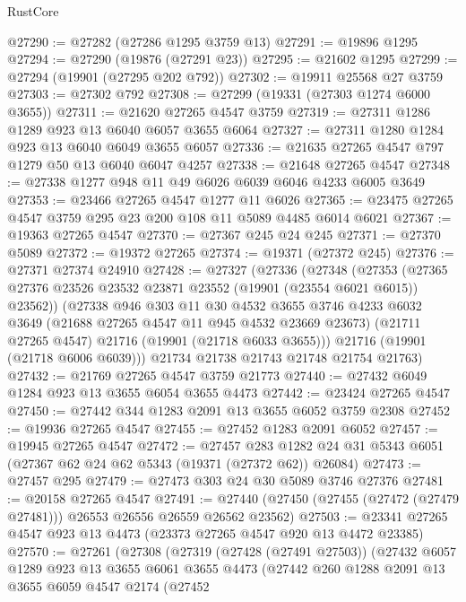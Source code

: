 \begin{lexlean}{RustCore}
\begin{coremodule}
@27290 := @27282 (@27286 @1295 @3759 @13)
@27291 := @19896 @1295
@27294 := @27290 (@19876 (@27291 @23))
@27295 := @21602 @1295
@27299 := @27294 (@19901 (@27295 @202 @792))
@27302 := @19911 @25568 @27 @3759
@27303 := @27302 @792
@27308 := @27299 (@19331 (@27303 @1274 @6000 @3655))
@27311 := @21620 @27265 @4547 @3759
@27319 := @27311 @1286 @1289 @923 @13 @6040 @6057 @3655 @6064
@27327 := @27311 @1280 @1284 @923 @13 @6040 @6049 @3655 @6057
@27336 := @21635 @27265 @4547 @797 @1279 @50 @13 @6040 @6047 @4257
@27338 := @21648 @27265 @4547
@27348 := @27338 @1277 @948 @11 @49 @6026 @6039 @6046 @4233 @6005 @3649
@27353 := @23466 @27265 @4547 @1277 @11 @6026
@27365 := @23475 @27265 @4547 @3759 @295 @23 @200 @108 @11 @5089 @4485 @6014 @6021
@27367 := @19363 @27265 @4547
@27370 := @27367 @245 @24 @245
@27371 := @27370 @5089
@27372 := @19372 @27265
@27374 := @19371 (@27372 @245)
@27376 := @27371 @27374 @24910
@27428 := @27327
    (@27336
      (@27348
        (@27353 (@27365 @27376 @23526 @23532 @23871 @23552 (@19901 (@23554 @6021 @6015)) @23562))
        (@27338
          @946
          @303
          @11
          @30
          @4532
          @3655
          @3746
          @4233
          @6032
          @3649
          (@21688 @27265 @4547 @11 @945 @4532 @23669 @23673)
          (@21711 @27265 @4547)
          @21716
          (@19901 (@21718 @6033 @3655)))
        @21716
        (@19901 (@21718 @6006 @6039)))
      @21734
      @21738
      @21743
      @21748
      @21754
      @21763)
@27432 := @21769 @27265 @4547 @3759 @21773
@27440 := @27432 @6049 @1284 @923 @13 @3655 @6054 @3655 @4473
@27442 := @23424 @27265 @4547
@27450 := @27442 @344 @1283 @2091 @13 @3655 @6052 @3759 @2308
@27452 := @19936 @27265 @4547
@27455 := @27452 @1283 @2091 @6052
@27457 := @19945 @27265 @4547
@27472 := @27457
    @283
    @1282
    @24
    @31
    @5343
    @6051
    (@27367 @62 @24 @62 @5343 (@19371 (@27372 @62)) @26084)
@27473 := @27457 @295
@27479 := @27473 @303 @24 @30 @5089 @3746 @27376
@27481 := @20158 @27265 @4547
@27491 := @27440 (@27450 (@27455 (@27472 (@27479 @27481))) @26553 @26556 @26559 @26562 @23562)
@27503 := @23341 @27265 @4547 @923 @13 @4473 (@23373 @27265 @4547 @920 @13 @4472 @23385)
@27570 := @27261
    (@27308
      (@27319
        (@27428 (@27491 @27503))
        (@27432
          @6057
          @1289
          @923
          @13
          @3655
          @6061
          @3655
          @4473
          (@27442
            @260
            @1288
            @2091
            @13
            @3655
            @6059
            @4547
            @2174
            (@27452

\end{coremodule}
\end{lexlean}

